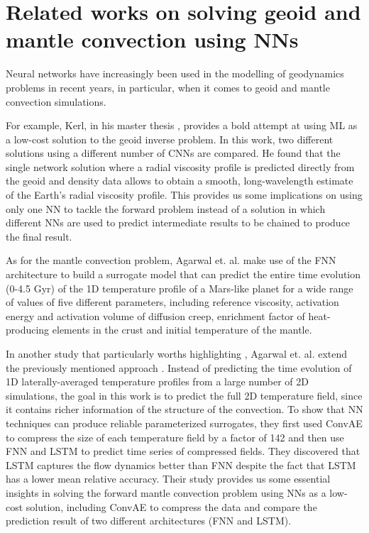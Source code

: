 \section{Related works on solving geoid and mantle convection using NNs}

Neural networks have increasingly been used in the modelling of geodynamics problems in recent years, in particular, when it comes to geoid and mantle convection simulations. 

For example, Kerl, in his master thesis \citep{kerl2022geoid}, provides a bold attempt at using ML as a low-cost solution to the geoid inverse problem. In this work, two different solutions using a different number of CNNs are compared. He found that the single network solution where a radial viscosity profile is predicted directly from the geoid and density data allows to obtain a smooth, long-wavelength estimate of the Earth's radial viscosity profile. This provides us some implications on using only one NN to tackle the forward problem instead of a solution in which different NNs are used to predict intermediate results to be chained to produce the final result.

As for the mantle convection problem, Agarwal et. al. \citep{10.1093_gji_ggaa234} make use of the FNN architecture to build a surrogate model that can predict the entire time evolution (0-4.5 Gyr) of the 1D temperature profile of a Mars-like planet for a wide range of values of five different parameters, including reference viscosity, activation energy and activation volume of diffusion creep, enrichment factor of heat-producing elements in the crust and initial temperature of the mantle.

In another study that particularly worths highlighting \citep{10.1103_physrevfluids.6.113801}, Agarwal et. al. extend the previously mentioned approach \citep{10.1093_gji_ggaa234}. Instead of predicting the time evolution of 1D laterally-averaged temperature profiles from a large number of 2D simulations, the goal in this work is to predict the full 2D temperature field, since it contains richer information of the structure of the convection.\citep{10.1103_physrevfluids.6.113801} To show that NN techniques can produce reliable parameterized surrogates, they first used ConvAE to compress the size of each temperature field by a factor of 142 and then use FNN and LSTM to predict time series of compressed fields. They discovered that LSTM captures the flow dynamics better than FNN despite the fact that LSTM has a lower mean relative accuracy. Their study provides us some essential insights in solving the forward mantle convection problem using NNs as a low-cost solution, including ConvAE to compress the data and compare the prediction result of two different architectures (FNN and LSTM).

